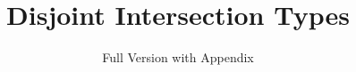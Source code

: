 \documentclass{llncs}
\begin{document}

\title{Disjoint Intersection Types}
\subtitle{Full Version with Appendix}

\maketitle

\begin{abstract}
  
\end{abstract}










\newpage



\clearpage
\onecolumn

\appendix

% 
\end{document}
